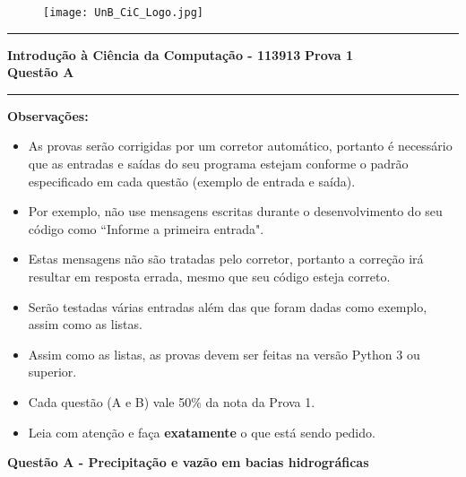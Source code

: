 \documentclass[a4paper, 12pt]{article}
\begin{document}
\begin{figure}[H]
	\texttt{[image: UnB\_CiC\_Logo.jpg]}
\end{figure}
\noindent\rule{\textwidth}{0.4pt}
\begin{center}
	\textbf{{\Large Introdução à Ciência da Computação - 113913}} \newline \newline
	\textbf{{\large Prova 1} \\
	\vspace{9pt}
	{\large Questão A}} \\
	\noindent\rule{\textwidth}{0.4pt}
	\newline
\end{center}

\textbf{{\large Observações:}}
\begin{itemize}
	\item As provas serão corrigidas por um corretor automático, portanto é necessário que as entradas e saídas do seu programa estejam conforme o padrão especificado em cada questão (exemplo de entrada e saída).
	\item Por exemplo, não use mensagens escritas durante o desenvolvimento do seu código como “Informe a primeira entrada".
	\item Estas mensagens não são tratadas pelo corretor, portanto a correção irá resultar em resposta errada, mesmo que seu código esteja correto.
	\item Serão testadas várias entradas além das que foram dadas como exemplo, assim como as listas.
	\item Assim como as listas, as provas devem ser feitas na versão Python 3 ou superior.
	\item Cada questão (A e B) vale 50\% da nota da Prova 1.
	\item Leia com atenção e faça \textbf{exatamente} o que está sendo pedido.


\end{itemize}
\newpage %
\begin{center}
\textbf{{\Large Questão A - Precipitação e vazão em bacias hidrográficas}}
\end{center}

\vspace{5pt} 
\end{document}
